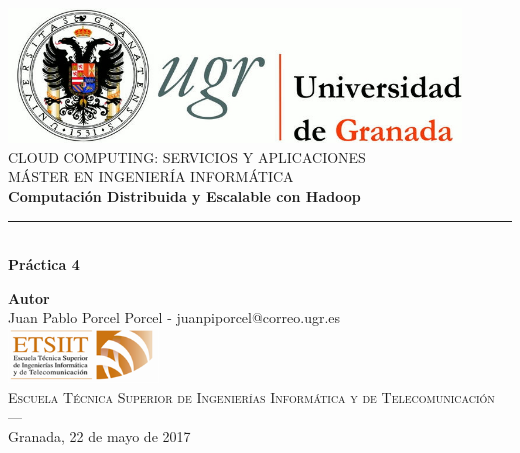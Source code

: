 \begin{titlepage}
 
 
\newlength{\centeroffset}
\setlength{\centeroffset}{-0.5\oddsidemargin}
\addtolength{\centeroffset}{0.5\evensidemargin}
\thispagestyle{empty}

\noindent\hspace*{\centeroffset}\begin{minipage}{\textwidth}

\centering
\includegraphics[width=0.9\textwidth]{images/logo_ugr.jpg}\\[1.4cm]

\textsc{ \Large CLOUD COMPUTING: SERVICIOS Y APLICACIONES\\[0.2cm]}
\textsc{ MÁSTER EN INGENIERÍA INFORMÁTICA }\\[1cm]
% 
{\Huge\bfseries Computación	Distribuida	y	Escalable	con	Hadoop	}
\noindent\rule[-1ex]{\textwidth}{3pt}\\[3.5ex]
{\large\bfseries Práctica 4}
\end{minipage}

\vspace{4.5cm}
\noindent\hspace*{\centeroffset}\begin{minipage}{\textwidth}
\centering

\textbf{Autor}\\ {Juan Pablo Porcel Porcel - juanpiporcel@correo.ugr.es}\\[1cm]
\includegraphics[width=0.3\textwidth]{images/etsiit_logo.png}\\[0.1cm]
\textsc{Escuela Técnica Superior de Ingenierías Informática y de Telecomunicación}\\
\textsc{---}\\
Granada, 22 de mayo de 2017
\end{minipage}
\end{titlepage}


